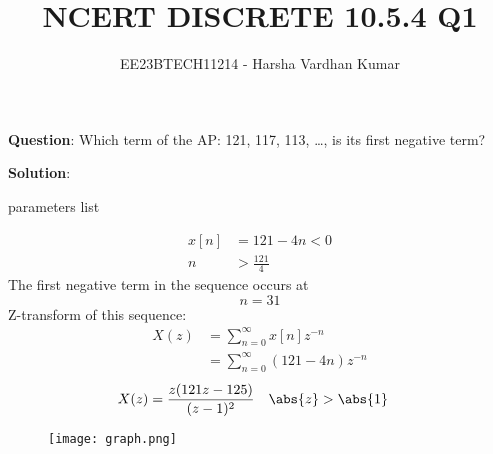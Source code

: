 \documentclass[journal,12pt,twocolumn]{IEEEtran}
\title{NCERT DISCRETE 10.5.4 Q1}
\author{EE23BTECH11214 - Harsha Vardhan Kumar}
\begin{document}
\maketitle

\noindent \textbf{Question}:
Which term of the AP: 121, 117, 113, \ldots, is its first negative term?

\textbf{Solution}:
\begin{table}[htbp]
\centering

\caption{parameters list}
\end{table}

\begin{align}
x[n] &= 121 - 4n < 0 \\
n &> \frac{121}{4} 
\end{align}
The first negative term in the sequence occurs at 
\[ n = 31 \]
Z-transform of this sequence:
\begin{align}
X(z) &= \sum_{n=0}^{\infty} x[n]z^{-n} \\
&= \sum_{n=0}^{\infty} (121 - 4n)z^{-n}
\end{align}
\begin{align}
    X(z) &= \frac{z(121z - 125)}{(z - 1)^2} \quad \abs{z}>\abs{1}
\end{align}
\pagebreak
\begin{figure}[!ht] 
\centering
\texttt{[image: graph.png]}
\label{fig:Graph1}
\end{figure}
\end{document}
